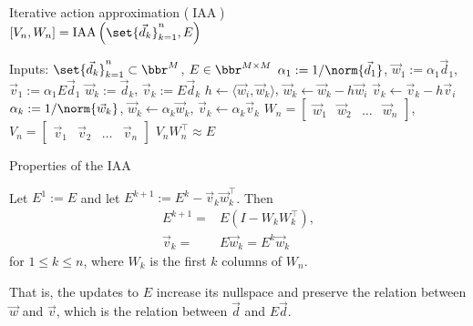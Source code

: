 \documentclass{beamer}
\DeclareMathOperator{\iaa}{IAA} %
\begin{document}
\begin{frame}
\begin{algorithm}[H]
	\caption{Iterative action approximation ($\iaa$) \\ $[V_n,W_n]=\iaa \left ( \set{\vec{d}_k}_{k=1}^n, E \right )$}
	\begin{algorithmic}[1]
		\State Inputs: $\set{\vec{d}_k}_{k=1}^{n} \subset \bbr^M$, $E \in \bbr^{M \times M}$
		\State $\alpha_1 := 1 / \norm{\vec{d}_1}$, $\vec{w}_1 := \alpha_1 \vec{d}_1$, $\vec{v}_1 := \alpha_1 E \vec{d}_1$
			\State $\vec{w}_k := \vec{d}_k$, $\vec{v}_k := E \vec{d}_k$
				\State $h \gets \langle \vec{w}_i, \vec{w}_k \rangle$, $\vec{w}_k \gets \vec{w}_k - h \vec{w}_i$
				\State $\vec{v}_k \gets \vec{v}_k - h \vec{v}_i$ \label{line: implicit}
			\EndFor
			\State $\alpha_k := 1 / \norm{\vec{w}_k}$, $\vec{w}_k \gets \alpha_k \vec{w}_k$, $\vec{v}_k \gets \alpha_k \vec{v}_k$
		\EndFor
		\State $W_{n} = \begin{bmatrix} \vec{w}_1 & \vec{w}_2 & \dots & \vec{w}_{n} \end{bmatrix}$, $V_{n} = \begin{bmatrix} \vec{v}_1 & \vec{v}_2 & \dots & \vec{v}_{n} \end{bmatrix}$
		\State $V_{n} W_{n}^\top \approx E$
	\end{algorithmic}
	\label{alg: IAA}
\end{algorithm}
\end{frame}

\begin{frame}{Properties of the IAA}
\begin{lemma} \label{lem: iaa}
	Let $E^1 := E$ and let $E^{k+1} := E^k - \vec{v}_k \vec{w}_k^\top$.
	Then
	\begin{align*}
		E^{k+1} = & E (I - W_k W_k^\top), \\
		\vec{v}_k = & E \vec{w}_k = E^k \vec{w}_k
	\end{align*}
	for $1 \leq k \leq n$, where $W_k$ is the first $k$ columns of $W_n$.
\end{lemma}

That is, the updates to $E$ increase its nullspace and preserve the relation between $\vec{w}$ and $\vec{v}$, which is the relation between $\vec{d}$ and $E \vec{d}$.
\end{frame}
\end{document}
